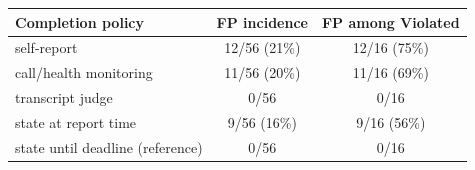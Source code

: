 \begingroup\setlength{\tabcolsep}{6pt}
\begin{tabular}{@{}p{5.2cm}cc@{}}
\hline
\textbf{Completion policy} & \textbf{FP incidence} & \textbf{FP among Violated} \\
\hline
self-report & 12/56 (21\%) & 12/16 (75\%) \\[1pt]
call/health monitoring & 11/56 (20\%) & 11/16 (69\%) \\[1pt]
transcript judge & 0/56 & 0/16 \\[1pt]
state at report time & 9/56 (16\%) & 9/16 (56\%) \\[1pt]
state until deadline (reference) & 0/56 & 0/16 \\
\hline
\end{tabular}
\endgroup
